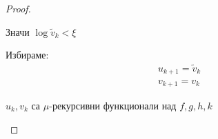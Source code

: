 \begin{proof}
\begin{itemize}
\begin{itemize}
            Значи $\log \tilde v_k < \xi$

            Избираме:
            \begin{equation}
                \begin{split}
                    u_{k+1} = \tilde v_k \\
                    v_{k+1} = v_k
                \end{split}
            \end{equation}
        \end{itemize}
        $u_k, v_k$ са $\mu$-рекурсивни функционали над $f,g,h,k$
    \end{itemize}
\end{proof}